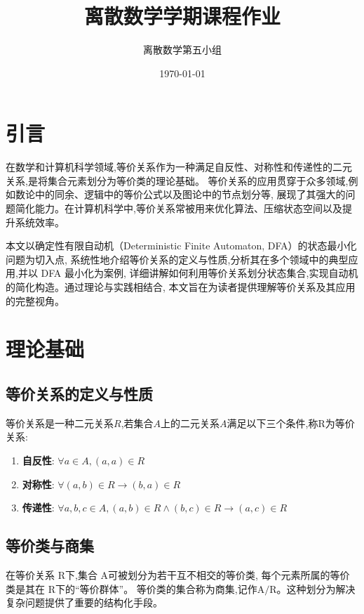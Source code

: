 \documentclass[UTF8]{ctexart}
\begin{document}
	
	\title{\Huge 离散数学学期课程作业}
	\author{\LARGE 离散数学第五小组}
	\date{\LARGE \today}
	
	\maketitle
	
	\section{引言}
	
	\large 在数学和计算机科学领域,等价关系作为一种满足自反性、对称性和传递性的二元关系,是将集合元素划分为等价类的理论基础。
		等价关系的应用贯穿于众多领域,例如数论中的同余、逻辑中的等价公式以及图论中的节点划分等,
		展现了其强大的问题简化能力。在计算机科学中,等价关系常被用来优化算法、压缩状态空间以及提升系统效率。
	
	\large 本文以确定性有限自动机（Deterministic Finite Automaton, DFA）的状态最小化问题为切入点,
		系统性地介绍等价关系的定义与性质,分析其在多个领域中的典型应用,并以 DFA 最小化为案例,
		详细讲解如何利用等价关系划分状态集合,实现自动机的简化构造。通过理论与实践相结合,
		本文旨在为读者提供理解等价关系及其应用的完整视角。
	
	\newpage
	\section{理论基础}
	\subsection{等价关系的定义与性质}
	
	\large{等价关系是一种二元关系$R$,若集合$A$上的二元关系$A$满足以下三个条件,称$\mathrm{R}$为等价关系:}
	
	\begin{enumerate}
		\item \large \textbf{自反性}: $\forall a \in A, (a,a) \in R$
		\item \large \textbf{对称性}: $\forall (a,b)\in R \rightarrow (b,a) \in R $
		\item \large \textbf{传递性}: $\forall a,b,c \in A, (a,b) \in R \wedge (b,c) \in R \rightarrow (a,c) \in R$
	\end{enumerate}
	\subsection{等价类与商集}
	\large 在等价关系 $\mathrm{R}$下,集合 $\mathrm{A}$可被划分为若干互不相交的等价类,
	每个元素所属的等价类是其在 $\mathrm{R}$下的“等价群体”。
	等价类的集合称为商集,记作$\mathrm{A}/\mathrm{R}$。这种划分为解决复杂问题提供了重要的结构化手段。
	
\end{document}
